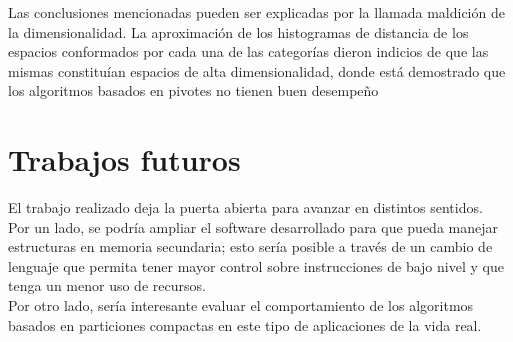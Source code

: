 Las conclusiones mencionadas pueden ser explicadas por la llamada maldici\'on de la dimensionalidad. La aproximaci\'on de los histogramas de distancia de los espacios conformados por cada una de las categor\'ias dieron indicios de que las mismas constitu\'ian espacios de alta dimensionalidad, donde est\'a demostrado que los algoritmos basados en pivotes no tienen buen desempeño \cite{BNCsccc01}\\

\section{Trabajos futuros}

El trabajo realizado deja la puerta abierta para avanzar en distintos sentidos.\\

Por un lado, se podr\'ia ampliar el software desarrollado para que pueda manejar estructuras en memoria secundaria; esto ser\'ia posible a trav\'es de un cambio de lenguaje que permita tener mayor control sobre instrucciones de bajo nivel y que tenga un menor uso de recursos.\\

Por otro lado, ser\'ia interesante evaluar el comportamiento de los algoritmos basados en particiones compactas en este tipo de aplicaciones de la vida real.